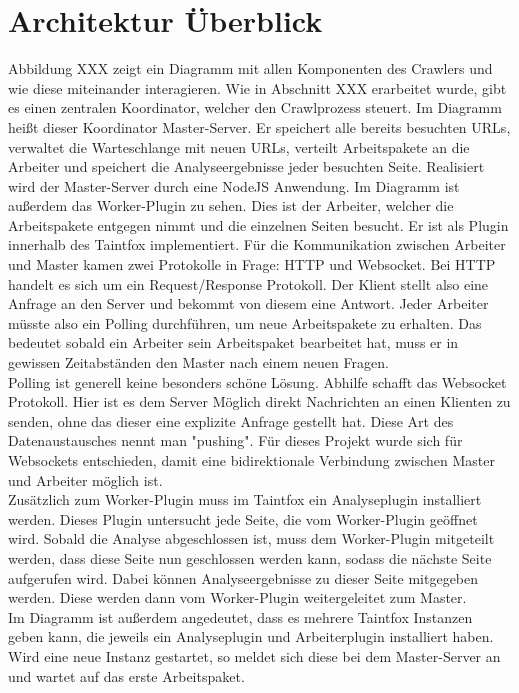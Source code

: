 \section{Architektur Überblick}
Abbildung XXX zeigt ein Diagramm mit allen Komponenten des Crawlers und wie diese miteinander interagieren. Wie in Abschnitt XXX erarbeitet wurde, gibt es einen zentralen Koordinator, welcher den Crawlprozess steuert. Im Diagramm heißt dieser Koordinator Master-Server. Er speichert alle bereits besuchten URLs, verwaltet die Warteschlange mit neuen URLs, verteilt Arbeitspakete an die Arbeiter und speichert die Analyseergebnisse jeder besuchten Seite. Realisiert wird der Master-Server durch eine NodeJS Anwendung.
Im Diagramm ist außerdem das Worker-Plugin zu sehen. Dies ist der Arbeiter, welcher die Arbeitspakete entgegen nimmt und die einzelnen Seiten besucht. Er ist als Plugin innerhalb des Taintfox implementiert. Für die Kommunikation zwischen Arbeiter und Master kamen zwei Protokolle in Frage: HTTP und Websocket. Bei HTTP handelt es sich um ein Request/Response Protokoll. Der Klient stellt also eine Anfrage an den Server und bekommt von diesem eine Antwort. Jeder Arbeiter müsste also ein Polling durchführen, um neue Arbeitspakete zu erhalten. Das bedeutet sobald ein Arbeiter sein Arbeitspaket bearbeitet hat, muss er in gewissen Zeitabständen den Master nach einem neuen Fragen. \\
Polling ist generell keine besonders schöne Lösung. Abhilfe schafft das Websocket Protokoll. Hier ist es dem Server Möglich direkt Nachrichten an einen Klienten zu senden, ohne das dieser eine explizite Anfrage gestellt hat. Diese Art des Datenaustausches nennt man "pushing". Für dieses Projekt wurde sich für Websockets entschieden, damit eine bidirektionale Verbindung zwischen Master und Arbeiter möglich ist.\\
Zusätzlich zum Worker-Plugin muss im Taintfox ein Analyseplugin installiert werden. Dieses Plugin untersucht jede Seite, die vom Worker-Plugin geöffnet wird. Sobald die Analyse abgeschlossen ist, muss dem Worker-Plugin mitgeteilt werden, dass diese Seite nun geschlossen werden kann, sodass die nächste Seite aufgerufen wird. Dabei können Analyseergebnisse zu dieser Seite mitgegeben werden. Diese werden dann vom Worker-Plugin weitergeleitet zum Master.\\
Im Diagramm ist außerdem angedeutet, dass es mehrere Taintfox Instanzen geben kann, die jeweils ein Analyseplugin und Arbeiterplugin installiert haben. Wird eine neue Instanz gestartet, so meldet sich diese bei dem Master-Server an und wartet auf das erste Arbeitspaket.

